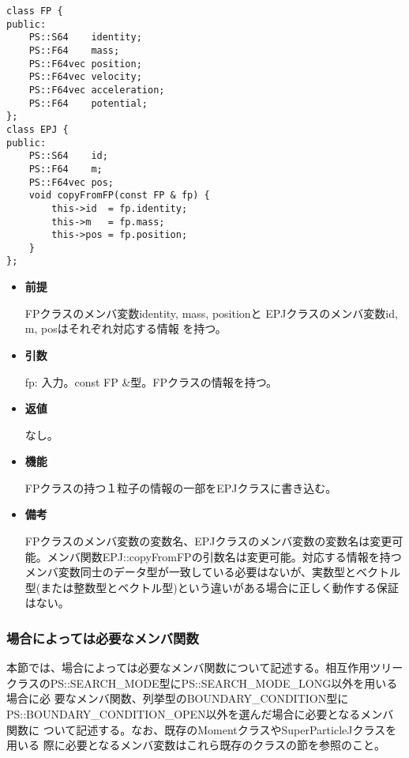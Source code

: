 
\begin{screen}
\begin{verbatim}
class FP {
public:
    PS::S64    identity;
    PS::F64    mass;
    PS::F64vec position;
    PS::F64vec velocity;
    PS::F64vec acceleration;
    PS::F64    potential;
};
class EPJ {
public:
    PS::S64    id;
    PS::F64    m;
    PS::F64vec pos;
    void copyFromFP(const FP & fp) {
        this->id  = fp.identity;
        this->m   = fp.mass;
        this->pos = fp.position;
    }
};
\end{verbatim}
\end{screen}

\begin{itemize}

\item {\bf 前提}

  FPクラスのメンバ変数identity, mass, positionと
  EPJクラスのメンバ変数id, m, posはそれぞれ対応する情報
  を持つ。

\item {\bf 引数}

  fp: 入力。const FP \&型。FPクラスの情報を持つ。
  
\item {\bf 返値}

  なし。
  
\item {\bf 機能}

  FPクラスの持つ１粒子の情報の一部をEPJクラスに書き込む。
  
\item {\bf 備考}

  FPクラスのメンバ変数の変数名、EPJクラスのメンバ変数の変数名は変更可
  能。メンバ関数EPJ::copyFromFPの引数名は変更可能。対応する情報を持つ
  メンバ変数同士のデータ型が一致している必要はないが、実数型とベクトル
  型(または整数型とベクトル型)という違いがある場合に正しく動作する保証
  はない。

\end{itemize}

\subsubsection{場合によっては必要なメンバ関数}


本節では、場合によっては必要なメンバ関数について記述する。相互作用ツリー
クラスのPS::SEARCH\_MODE型にPS::SEARCH\_MODE\_LONG以外を用いる場合に必
要なメンバ関数、列挙型のBOUNDARY\_CONDITION型に
PS::BOUNDARY\_CONDITION\_OPEN以外を選んだ場合に必要となるメンバ関数に
ついて記述する。なお、既存のMomentクラスやSuperParticleJクラスを用いる
際に必要となるメンバ変数はこれら既存のクラスの節を参照のこと。

